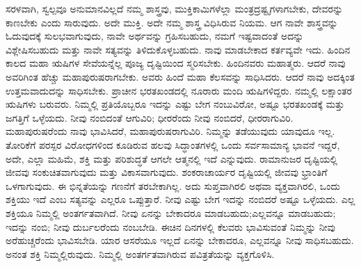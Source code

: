 ಸರಳವಾಗಿ, ಸ್ವಲ್ಪವೂ ಅನುಮಾನವಿಲ್ಲದೆ ನಮ್ಮ ಶಾಸ್ತ್ರವು, ಮುಕ್ತಿಕಾಮಿಗಳೆಲ್ಲಾ ಮಂತ್ರದ್ರಷ್ಟೃಗಳಾಗಬೇಕು, ದೇವರನ್ನು ಕಾಣಬೇಕು ಎಂದು ಸಾರುವುದು. ಅದೇ ಮುಕ್ತಿ. ಅದೇ ನಮ್ಮ ಶಾಸ್ತ್ರ ವಿಧಿಸಿರುವ ನಿಯಮ. ಆಗ ನಾವೇ ಶಾಸ್ತ್ರವನ್ನು ಓದುವುದಕ್ಕೆ ಸುಲಭವಾಗುವುದು, ನಾವೇ ಅರ್ಥವನ್ನು ಗ್ರಹಿಸಬಹುದು, ನಮಗೆ ಇಷ್ಟವಾದಂತೆ ಅದನ್ನು ವಿಶ್ಲೇಷಿಸಬಹುದು ಮತ್ತು ನಾವೇ ಸತ್ಯವನ್ನು ತಿಳಿದುಕೊಳ್ಳಬಹುದು. ನಾವು ಮಾಡಬೇಕಾದ ಕರ್ತವ್ಯವೇ ಇದು. ಹಿಂದಿನ ಕಾಲದ ಮಹಾ ಋಷಿಗಳ ಸೇವೆಯನ್ನೆಲ್ಲ ಪೂಜ್ಯ ದೃಷ್ಟಿಯಿಂದ ಸ್ಮರಿಸಬೇಕು. ಹಿಂದಿನವರು ಮಹಾತ್ಮರು. ಆದರೆ ನಾವು ಅವರಿಗಿಂತ ಹೆಚ್ಚು ಮಹಾಪುರುಷರಾಗಬೇಕು. ಅವರು ಹಿಂದೆ ಮಹಾ ಕೆಲಸವನ್ನು ಸಾಧಿಸಿದರು. ಆದರೆ ನಾವು ಅದಕ್ಕಿಂತ ಉತ್ತಮವಾದುದನ್ನು ಸಾಧಿಸಬೇಕು. ಪ್ರಾಚೀನ ಭರತಖಂಡದಲ್ಲಿ ನೂರಾರು ಮಂದಿ ಋಷಿಗಳಿದ್ದರು. ನಮ್ಮಲ್ಲಿ ಲಕ್ಷಾಂತರ ಋಷಿಗಳು ಬರುವರು. ನಿಮ್ಮಲ್ಲಿ ಪ್ರತಿಯೊಬ್ಬರೂ ಇದನ್ನು ಎಷ್ಟು ಬೇಗ ನಂಬುವಿರೋ, ಅಷ್ಟೂ ಭರತಖಂಡಕ್ಕೆ ಮತ್ತು ಜಗತ್ತಿಗೆ ಒಳ್ಳೆಯದು. ನೀವು ನಂಬಿದಂತೆ ಆಗುವಿರಿ; ಧೀರರೆಂದು ನೀವು ನಂಬಿದರೆ, ಧೀರರಾಗುವಿರಿ. ಮಹಾಪುರುಷರೆಂದು ನಾವು ಭಾವಿಸಿದರೆ, ಮಹಾಪುರುಷರಾಗುವಿರಿ. ನಿಮ್ಮನ್ನು ತಡೆಯುವುದು ಯಾವುದೂ ಇಲ್ಲ. ತೋರಿಕೆಗೆ ಪರಸ್ಪರ ವಿರೋಧಗಳಿಂದ ಕೂಡಿರುವ ಹಲವು ಸಿದ್ಧಾಂತಗಳಲ್ಲಿ ಒಂದು ಸರ್ವಸಾಮಾನ್ಯ ಭಾವನೆ ಇದ್ದರೆ, ಅದೇ, ಎಲ್ಲಾ ಮಹಿಮೆ, ಶಕ್ತಿ ಮತ್ತು ಪರಿಶುದ್ಧತೆ ಆಗಲೇ ಆತ್ಮನಲ್ಲಿ ಇದೆ ಎನ್ನುವುದು. ರಾಮಾನುಜರ ದೃಷ್ಟಿಯಲ್ಲಿ ಜೀವವು ಸಂಕುಚಿತವಾಗುವುದು ಮತ್ತು ವಿಕಾಸವಾಗುವುದು. ಶಂಕರಾಚಾರ್ಯರ ದೃಷ್ಟಿಯಲ್ಲಿ ಜೀವವು ಭ್ರಾಂತಿಗೆ ಒಳಗಾಗುವುದು. ಈ ಭಿನ್ನತೆಯನ್ನು ಗಣನೆಗೆ ತರಬೇಕಾಗಿಲ್ಲ. ಅದು ಸುಪ್ತವಾಗಿರಲಿ ಅಥವಾ ವ್ಯಕ್ತವಾಗಿರಲಿ, ಒಂದು ಶಕ್ತಿಯು ಇದೆ ಎಂಬ ಸತ್ಯವನ್ನು ಎಲ್ಲರೂ ಒಪ್ಪುತ್ತಾರೆ. ನೀವು ಎಷ್ಟು ಬೇಗ ಇದನ್ನು ನಂಬಿದರೆ ಅಷ್ಟೂ ಒಳ್ಳೆಯದು. ಎಲ್ಲ ಶಕ್ತಿಯೂ ನಿಮ್ಮಲ್ಲಿ ಅಂತರ್ಗತವಾಗಿದೆ. ನೀವು ಏನನ್ನು ಬೇಕಾದರೂ ಮಾಡಬಹುದು;\break ಎಲ್ಲವನ್ನೂ ಮಾಡಬಹುದು; ಇದನ್ನು ನಂಬಿ; ನೀವು ದುರ್ಬಲರೆಂದು ನಂಬಬೇಡಿ. ಈಚಿನ ದಿನಗಳಲ್ಲಿ ಕೆಲವರು ಭಾವಿಸುವಂತೆ ನಿಮ್ಮನ್ನು ನೀವು ಅರೆಹುಚ್ಚರೆಂದು ಭಾವಿಸಬೇಡಿ. ಯಾರ ಆಸರೆಯೂ ಇಲ್ಲದೆ ಏನನ್ನು ಬೇಕಾದರೂ, ಎಲ್ಲವನ್ನೂ ನೀವು ಸಾಧಿಸಬಹುದು. ಅನಂತ ಶಕ್ತಿ ನಿಮ್ಮಲ್ಲಿರುವುದು. ನಿಮ್ಮಲ್ಲಿ ಅಂತರ್ಗತವಾಗಿರುವ ಪವಿತ್ರತೆಯನ್ನು ವ್ಯಕ್ತಗೊಳಿಸಿ.

